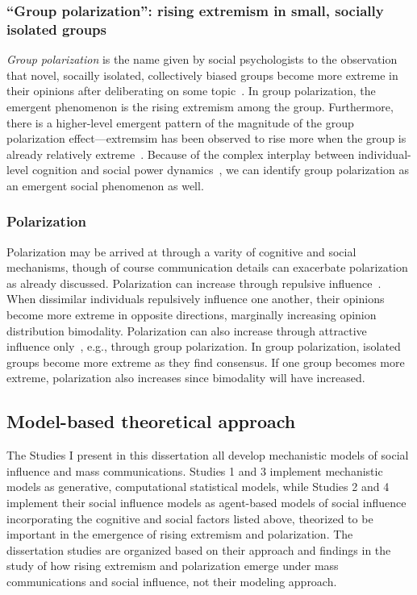 \subsubsection{``Group polarization'': rising extremism in small, socially isolated groups}

\emph{Group polarization} is the name given by social psychologists to the observation
that novel, socailly isolated, collectively biased groups become more extreme
in their opinions after deliberating on some 
topic~\cite{Brown1986,Isenberg1986,Brown2000,Sunstein2002}.
In group polarization, the emergent phenomenon is the rising extremism among the group.
Furthermore, there is a higher-level emergent pattern of the magnitude of the group polarization
effect---extremsim has been observed to rise more when the group is already
relatively extreme~\cite{Myers1982}. Because of the complex interplay between individual-level
cognition and social power dynamics~\cite{Friedkin1999a}, we can identify group
polarization as an emergent social phenomenon as well. 

\subsubsection{Polarization}

Polarization may be arrived at through a varity of cognitive and social mechanisms, 
though of course communication details can exacerbate polarization as already discussed.
Polarization can increase through repulsive 
influence~\cite{Baldassarri2007,Flache2011,Bail2018,Turner2018}. When dissimilar
individuals repulsively influence one another, their opinions become more
extreme in opposite directions, marginally increasing opinion distribution
bimodality. Polarization can also increase through attractive influence only~\cite{Mas2013,Turner2020},
e.g., through group polarization.
In group polarization, isolated groups become more extreme as they find consensus. 
If one group becomes more extreme, polarization also increases
since bimodality will have increased. 

\subsection{Model-based theoretical approach}

The Studies I present in this dissertation all develop
mechanistic models of social influence and mass communications. Studies 1 and
3 implement mechanistic models as generative, computational statistical models, while
Studies 2 and 4 implement their social influence models as agent-based models
of social influence incorporating the cognitive and social factors listed above,
theorized to be important in the emergence of rising extremism and polarization.
The dissertation studies are organized based on their approach
and findings in the study of how rising extremism and polarization emerge
under mass communications and social influence, not their modeling approach.

